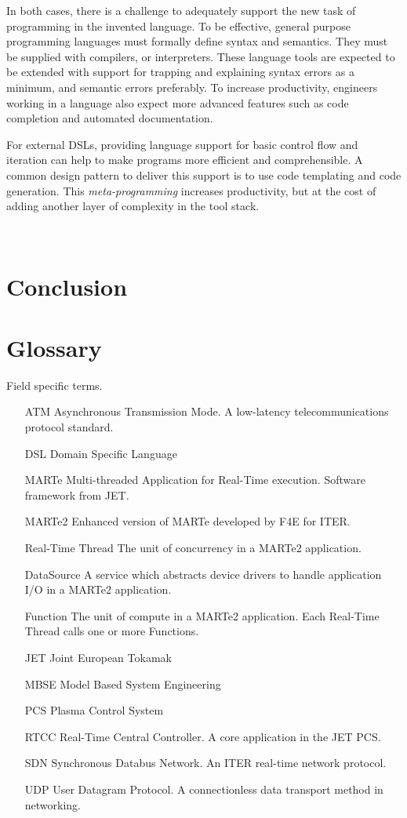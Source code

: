 \documentclass[preprint,12pt]{elsarticle}
\begin{document}
In both cases, there is a challenge to adequately support the new task of programming
in the invented language.  To be effective, general purpose programming languages must
formally define syntax and semantics. They must be supplied with compilers, or interpreters.
These language tools are expected to be extended with support for trapping and explaining
syntax errors as a minimum, and semantic errors preferably.  To increase productivity, 
engineers working in a language also expect more advanced features such as code completion
and automated documentation.

For external DSLs, providing language support for basic control flow and iteration
can help to make programs more efficient and comprehensible.  A common design pattern
to deliver this support is to use code templating and code generation.  This
{\em meta-programming} increases productivity, but at the cost of adding another
layer of complexity in the tool stack.


\

\section{Conclusion}



\section{Glossary}

Field specific terms.

\begin{itemize}
\item[ATM]{Asynchronous Transmission Mode.  A low-latency telecommunications protocol standard.}
\item[DSL]{Domain Specific Language}
\item[MARTe]{Multi-threaded Application for Real-Time execution.  Software framework from JET.}
\item[MARTe2]{Enhanced version of MARTe developed by F4E for ITER.}
\item[Real-Time Thread]{The unit of concurrency in a MARTe2 application.}
\item[DataSource]{A service which abstracts device drivers to handle application I/O in a MARTe2 application.}
\item[Function]{The unit of compute in a MARTe2 application.  Each Real-Time Thread calls one or more Functions.}
\item[JET]{Joint European Tokamak}
\item[MBSE]{Model Based System Engineering}
\item[PCS]{Plasma Control System}
\item[RTCC]{Real-Time Central Controller.  A core application in the JET PCS.}
\item[SDN]{Synchronous Databus Network.  An ITER real-time network protocol.}
\item[UDP]{User Datagram Protocol. A connectionless data transport method in networking.}
\end{itemize}
\end{document}
